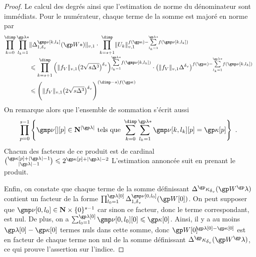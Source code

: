 \begin{proof}
  Le calcul des degrés ainsi que l'estimation de norme du dénominateur sont
  immédiats. Pour le numérateur, chaque terme de la somme est majoré en norme
  par
  \begin{align}
    \prod\indrange
    \prod_{ \indi_\ind = 1 }^{ \ip* }
    &
    \nv1{ \pmnum^\indl_{1, \dv}( \anyvp* ) }
    \cdot
    \prod_{\ind = \anydim + 1}^{\dimp}
    \nv1{ \pden_\ind }^{ f(\derp)
      - \smash{ \sum\limits_{\indi_\ind = 1}^{\ip*} } f(\indl) }
    \\ & \le
    \prod_{\ind = \anydim + 1}^{\dimp}
    \left(
      \nv1{ \chow\anyvar }
      \bigl( 2 \sqrt{\anydim \anydeg^{3}} \bigr)^\dv
    \right)^{ \smash{ \sum\limits_{\indi_\ind = 1}^{\ip*} } f(\indl) }
    \cdot \left(
      \nv1{ \chow\anyvar } \anydeg^\dv
    \right)^{ f(\derp)
      - \smash{ \sum\limits_{\indi_\ind = 1}^{\ip*} } f(\indl) }
    \\ & \le
    \Biggl(
    \nv1{ \chow\anyvar }
    \bigl( 2 \sqrt{\anydim \anydeg^{3}} \bigr)^\dv
    \Biggr)^{(\dimp - \anydim) f(\derp)}
  \end{align}
  On remarque alors que l'ensemble de sommation s'écrit aussi
  \begin{equation}
    \prod_{p = 0}^{\anydim - 1} \left\{
      \gmp\nu[][p] \in \N^{\lgr\ip}
      \text{ tels que }
      \sum\indrange \sum_{\indi_\ind = 1}^{\ip*}
      \gmp\nu[\ind, \indi_\ind][p]
      = \derp[p]
    \right\}
    \pmm.
  \end{equation}
  Chacun des facteurs de ce produit est de cardinal
  \(
    \binom{ \derp[p] + \lgr\ip - 1 }{ \lgr\ip - 1 }
    \le
    2^{ \derp[p] + \lgr\ip - 2 }
  \)
  L'estimation annoncée suit en prenant le produit.

  Enfin, on constate que chaque terme de la somme définissant
  \( \pmnum^\derp_\dv ( \anyvp^\ip ) \) contient un facteur de la forme
  \(
    \prod_{\indi_0 = 1}^{\ip[0]}
    \pmnum_{1, \dv}^{\gmp\nu[0, \indi_0]}( \anyvp[0] )
  \). On peut supposer que \( \gmp\nu[0, \indi_0] \in \N \times
    \set{0}^{\anydim-1} \) car sinon ce facteur, donc le terme correspondant,
  est nul. De plus, on a \( \sum_{\indi_0 = 1}^{\ip[0]} \gmp\nu[0, \indi_0][0]
    \le \derp[0] \). Ainsi, il y a au moins \( \ip[0] - \derp[0] \) termes
  nuls dans cette somme, donc \( \anyvp[0]^{\!\!\ip[0] - \derp[0]} \) est en
  facteur de chaque terme non nul de la somme définissant \( \pmnum^\derp_\dv
    ( \anyvp^\ip ) \), ce qui prouve l'assertion sur l'indice.
\end{proof}

